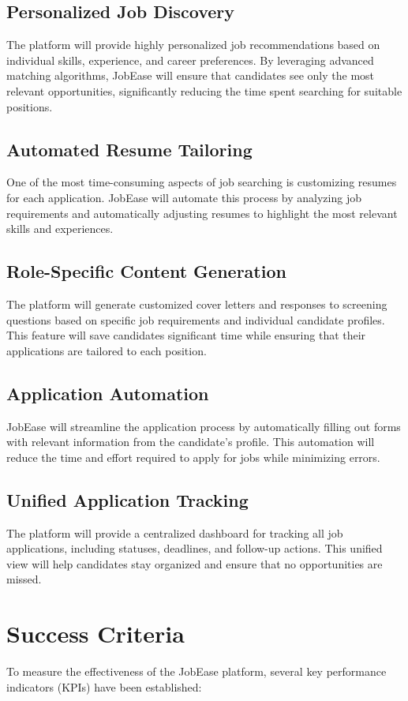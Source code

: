 \documentclass[12pt,a4paper]{report}
\begin{document}
\subsection{Personalized Job Discovery}
The platform will provide highly personalized job recommendations based on individual skills, experience, and career preferences. By leveraging advanced matching algorithms, JobEase will ensure that candidates see only the most relevant opportunities, significantly reducing the time spent searching for suitable positions.

\subsection{Automated Resume Tailoring}
One of the most time-consuming aspects of job searching is customizing resumes for each application. JobEase will automate this process by analyzing job requirements and automatically adjusting resumes to highlight the most relevant skills and experiences.

\subsection{Role-Specific Content Generation}
The platform will generate customized cover letters and responses to screening questions based on specific job requirements and individual candidate profiles. This feature will save candidates significant time while ensuring that their applications are tailored to each position.

\subsection{Application Automation}
JobEase will streamline the application process by automatically filling out forms with relevant information from the candidate's profile. This automation will reduce the time and effort required to apply for jobs while minimizing errors.

\subsection{Unified Application Tracking}
The platform will provide a centralized dashboard for tracking all job applications, including statuses, deadlines, and follow-up actions. This unified view will help candidates stay organized and ensure that no opportunities are missed.

\section{Success Criteria}
To measure the effectiveness of the JobEase platform, several key performance indicators (KPIs) have been established:
\end{document}
